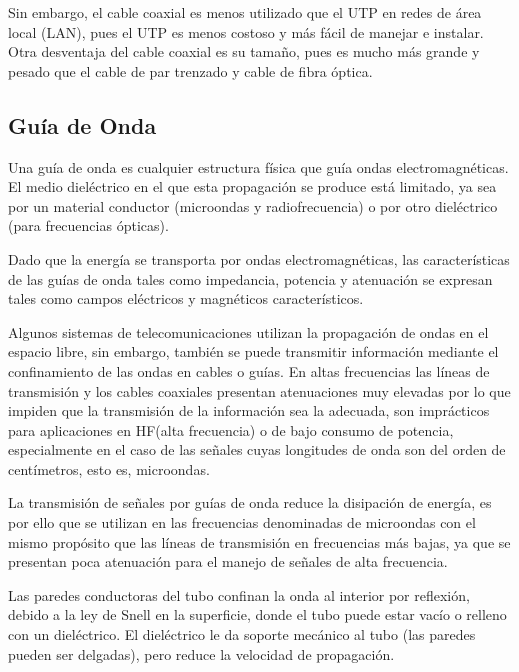 \documentclass[a4paper]{article}
\begin{document}
Sin embargo, el cable coaxial es menos utilizado que el UTP en redes de
área local (LAN), pues el UTP es menos costoso y más fácil de manejar e
instalar. Otra desventaja del cable coaxial es su tamaño, pues es mucho
más grande y pesado que el cable de par trenzado y cable de fibra
óptica.

\subsection{Gu\'ia de Onda}
Una guía de onda es cualquier estructura física que guía ondas
electromagnéticas. El medio dieléctrico en el que esta propagación se
produce está limitado, ya sea por un material conductor (microondas y
radiofrecuencia) o por otro dieléctrico (para frecuencias ópticas).

Dado que la energía se transporta por ondas electromagnéticas, las
características de las guías de onda tales como impedancia, potencia y
atenuación se expresan tales como campos eléctricos y magnéticos
característicos.

Algunos sistemas de telecomunicaciones utilizan la propagación de ondas
en el espacio libre, sin embargo, también se puede transmitir
información mediante el confinamiento de las ondas en cables o guías. En
altas frecuencias las líneas de transmisión y los cables coaxiales
presentan atenuaciones muy elevadas por lo que impiden que la
transmisión de la información sea la adecuada, son imprácticos para
aplicaciones en HF(alta frecuencia) o de bajo consumo de potencia,
especialmente en el caso de las señales cuyas longitudes de onda son del
orden de centímetros, esto es, microondas.

La transmisión de señales por guías de onda reduce la disipación de
energía, es por ello que se utilizan en las frecuencias denominadas de
microondas con el mismo propósito que las líneas de transmisión en
frecuencias más bajas, ya que se presentan poca atenuación para el
manejo de señales de alta frecuencia.

Las paredes conductoras del tubo confinan la onda al interior por
reflexión, debido a la ley de Snell en la superficie, donde el tubo
puede estar vacío o relleno con un dieléctrico. El dieléctrico le da
soporte mecánico al tubo (las paredes pueden ser delgadas), pero reduce
la velocidad de propagación.
\end{document}
